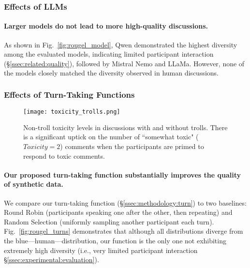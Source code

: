 \subsubsection{Effects of LLMs}

\paragraph{Larger models do not lead to more high-quality discussions.} As shown in Fig.~\ref{fig:rougel_model}, Qwen demonstrated the highest diversity among the evaluated models, indicating limited participant interaction (\S\ref{ssec:related:quality}), followed by Mistral Nemo and LLaMa. However, none of the models closely matched the diversity observed in human discussions. 



\subsubsection{Effects of Turn-Taking Functions}

\begin{figure}[t]
	\centering
	\texttt{[image: toxicity\_trolls.png]}
	\caption{Non-troll toxicity levels in discussions with and without trolls. There is a significant uptick on the number of ``somewhat toxic" ($Toxicity=2$) comments when the participants are primed to respond to toxic comments.}
	\label{fig:toxicity_trolls}
\end{figure}


\paragraph{Our proposed turn-taking function substantially improves the quality of synthetic data.} We compare our turn-taking function (\S\ref{ssec:methodology:turn}) to two baselines: Round Robin (participants speaking one after the other, then repeating) and Random Selection (uniformly sampling another participant each turn). Fig.~\ref{fig:rougel_turns} demonstrates that although all distributions diverge from the blue—human—distribution, our function is the only one not exhibiting extremely high diversity (i.e., very limited participant interaction \S\ref{ssec:experimental:evaluation}).



